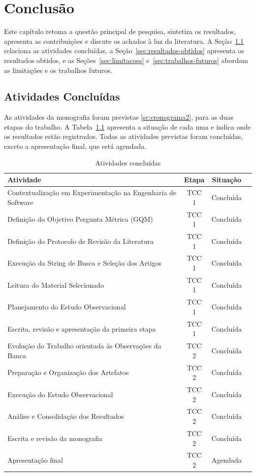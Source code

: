 \chapter{Conclusão}
\label{ch:conclusao}

Este capítulo retoma a questão principal de pesquisa, sintetiza os resultados, apresenta as contribuições e discute os achados à luz da literatura. A Seção~\ref{sec:atividades-concluidas} relaciona as atividades concluídas, a Seção~\ref{sec:resultados-obtidos} apresenta os resultados obtidos, e as Seções~\ref{sec:limitacoes} e~\ref{sec:trabalhos-futuros} abordam as limitações e os trabalhos futuros.

\section{Atividades Concluídas}
\label{sec:atividades-concluidas}

As atividades da monografia foram previstas \ref{sc:cronograma2}, para as duas etapas do trabalho. A Tabela~\ref{quad:atividades} apresenta a situação de cada uma e indica onde os resultados estão registrados. Todas as atividades previstas foram concluídas, exceto a apresentação final, que está agendada.

\begin{table}[h]
\centering
\caption{Atividades concluídas}
\label{quad:atividades}
\small
\begin{tabular}{|p{7.2cm}|c|c|c|}
\hline
\textbf{Atividade} & \textbf{Etapa} & \textbf{Situação} \\
\hline
Contextualização em Experimentação na Engenharia de Software & TCC 1 & Concluída \\
\hline
Definição do Objetivo Pergunta Métrica (GQM) & TCC 1 & Concluída  \\
\hline
Definição do Protocolo de Revisão da Literatura & TCC 1 & Concluída \\
\hline
Execução da String de Busca e Seleção dos Artigos & TCC 1 & Concluída \\
\hline
Leitura do Material Selecionado & TCC 1 & Concluída \\
\hline
Planejamento do Estudo Observacional & TCC 1 & Concluída \\
\hline
Escrita, revisão e apresentação da primeira etapa & TCC 1 & Concluída \\
\hline
Evolução do Trabalho orientada às Observações da Banca & TCC 2 & Concluída \\
\hline
Preparação e Organização dos Artefatos & TCC 2 & Concluída \\
\hline
Execução do Estudo Observacional & TCC 2 & Concluída \\
\hline
Análise e Consolidação dos Resultados & TCC 2 & Concluída \\
\hline
Escrita e revisão da monografia & TCC 2 & Concluída \\
\hline
Apresentação final & TCC 2 & Agendada \\
\hline
\end{tabular}
\end{table}

